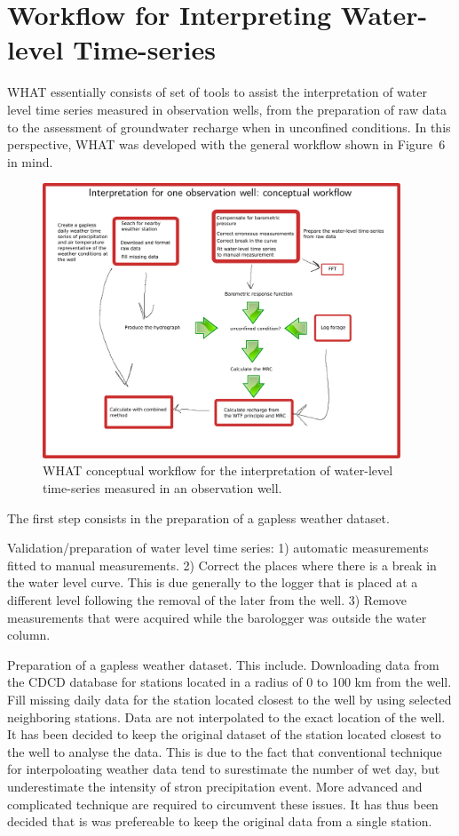 \documentclass[12pt, letterpaper, fleqn]{report}
\begin{document}
\section{Workflow for Interpreting Water-level Time-series}

WHAT essentially consists of set of tools to assist the interpretation of water level time series measured in observation wells, from the preparation of raw data to the assessment of groundwater recharge when in unconfined conditions. In this perspective, WHAT was developed with the general workflow shown in Figure 6  in mind.

\begin{figure}[h!]
\centering
\includegraphics[width=0.95\textwidth]{WHAT_Workflow}
\caption[WHAT conceptual workflow.]{WHAT conceptual workflow for the interpretation of water-level time-series measured in an observation well.}
\label{fig:WHAT_workflow}
\end{figure}

The first step consists in the preparation of a gapless weather dataset.

Validation/preparation of water level time series: 1) automatic measurements fitted to manual measurements. 2) Correct the places where there is a break in the water level curve. This is due generally to the logger that is placed at a different level following the removal of the later from the well. 3) Remove measurements that were acquired while the barologger was outside the water column.

Preparation of a gapless weather dataset. This include. Downloading data from the CDCD database for stations located in a radius of 0 to 100 km from the well. Fill missing daily data for the station located closest to the well by using selected neighboring stations. Data are not interpolated to the exact location of the well. It has been decided to keep the original dataset of the station located closest to the well to analyse the data. This is due to the fact that conventional technique for interpoloating weather data tend to surestimate the number of wet day, but underestimate the intensity of stron precipitation event. More advanced and complicated technique are required to circumvent these issues. It has thus been decided that is was prefereable to keep the original data from a single station.
\end{document}
